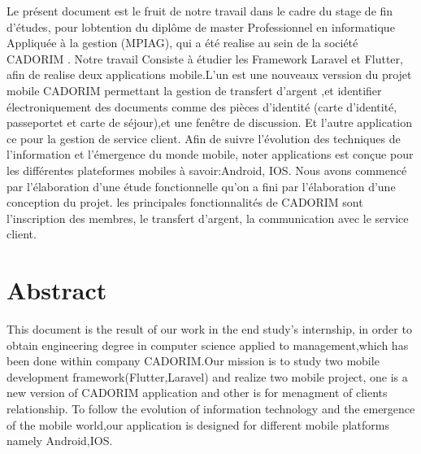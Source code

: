 \documentclass[a4paper, 12pt]{report}
\begin{document}
			
	Le présent document est le fruit de notre travail dans le cadre du stage de fin d'études, pour lobtention du diplôme de master Professionnel en informatique 	Appliquée à la gestion (MPIAG), qui a été realise au sein de la société CADORIM . Notre travail Consiste à étudier les Framework Laravel et Flutter, afin de realise deux applications mobile.L'un est une nouveaux verssion du projet mobile CADORIM permettant la gestion de transfert d'argent  ,et  identifier électroniquement des documents comme des pièces d’identité (carte d’identité, passeportet et carte de séjour),et une fenêtre de discussion.
	Et l'autre application ce pour la gestion de service client.\newline\newline
	Afin de suivre l'évolution des techniques de l'information et l'émergence du monde mobile, noter  applications est conçue pour les différentes plateformes mobiles à savoir:Android, IOS.\newline\newline
	Nous avons commencé par l'élaboration d'une étude fonctionnelle qu'on a fini par l'élaboration d'une conception du projet.\newline\newline
	les principales fonctionnalités de CADORIM sont l'inscription des membres, le transfert d'argent, la communication avec le service client.

	
	\thispagestyle{empty}
	\chapter*{Abstract} \label{chap:1Resumé1}
This document is the result of our work in the end study's  internship,
in order to obtain engineering degree in computer science applied to management,which has been done within company CADORIM.Our mission is to study two mobile development framework(Flutter,Laravel) and realize two mobile project, one is a new version of  CADORIM application and other is for menagment of clients relationship.\newline\newline
To follow the evolution of information technology and the emergence of the mobile world,our application is designed for different mobile platforms  namely Android,IOS.\newline\newline
\end{document}
